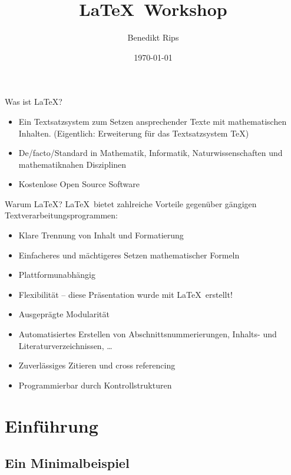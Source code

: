 \documentclass[german,10pt]{f1rstlady/templates/presentation}
\title{\LaTeX~Workshop}
\author{Benedikt Rips}
\institute{\LaTeX~Universität}
\date{\today}
\begin{document}
\frame[plain]{\titlepage}


\AtBeginSection[]{
    \begin{frame}
        \tableofcontents[currentsection, sectionstyle=show/shaded]
    \end{frame}}

\begin{frame}{Was ist \LaTeX?}
\begin{itemize}
    \item Ein Textsatzsystem zum Setzen ansprechender Texte mit mathematischen Inhalten.
        (Eigentlich: Erweiterung für das Textsatzsystem \TeX)
    \smallskip
    \item De\-/facto\-/Standard in Mathematik, Informatik, Naturwissenschaften und mathematiknahen
        Disziplinen
    \smallskip
    \item Kostenlose Open Source Software
\end{itemize}
\end{frame}

\begin{frame}{Warum \LaTeX?}
\LaTeX~bietet zahlreiche Vorteile gegenüber gängigen Textverarbeitungsprogrammen:
\begin{itemize}
    \item Klare Trennung von Inhalt und Formatierung
    \item Einfacheres und mächtigeres Setzen mathematischer Formeln
    \item Plattformunabhängig
    \item Flexibilität – diese Präsentation wurde mit \LaTeX~erstellt!
    \item Ausgeprägte Modularität
    \item Automatisiertes Erstellen von Abschnittsnummerierungen, Inhalts- und
        Literaturverzeichnissen, \dots
    \item Zuverlässiges Zitieren und cross referencing
    \item Programmierbar durch Kontrollstrukturen
\end{itemize}
\end{frame}

\section{Einführung}

\subsection{Ein Minimalbeispiel}
\end{document}
